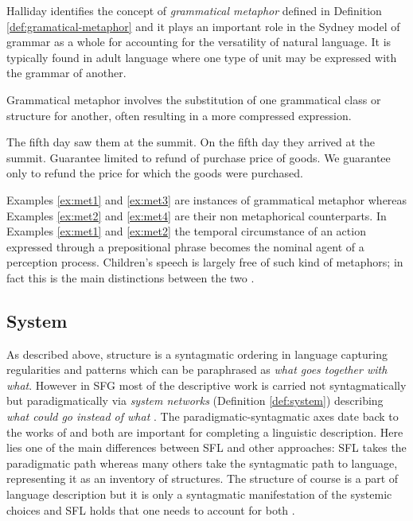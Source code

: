     Halliday identifies the concept of \textit{grammatical metaphor} defined in Definition \ref{def:gramatical-metaphor} and it plays an important role in the Sydney model of grammar as a whole for accounting for the versatility of natural language. It is typically found in adult language where one type of unit may be expressed with the grammar of another.
    
    \begin{definition}\label{def:gramatical-metaphor}
        Grammatical metaphor involves the substitution of one grammatical class or structure for another, often resulting in a more compressed expression.
    \end{definition}
    
    \begin{exe}
        \ex\label{ex:met1} The fifth day saw them at the summit.
        \ex\label{ex:met2} On the fifth day they arrived at the summit.
        \ex\label{ex:met3} Guarantee limited to refund of purchase price of goods.
        \ex\label{ex:met4} We guarantee only to refund the price for which the goods were purchased.
    \end{exe}
    
    Examples \ref{ex:met1} and \ref{ex:met3} are instances of grammatical metaphor whereas Examples \ref{ex:met2} and \ref{ex:met4} are their non metaphorical counterparts. In Examples \ref{ex:met1} and \ref{ex:met2} the temporal circumstance of an action expressed through a prepositional phrase becomes the nominal agent of a perception process. Children's speech is largely free of such kind of metaphors; in fact this is the main distinctions between the two \citep{Halliday2013}. 

\subsection{System}
\label{sec:system}
    As described above, structure is a syntagmatic ordering in language capturing regularities and patterns which can be paraphrased as \textit{what goes together with what}. However in SFG most of the descriptive work is carried not syntagmatically but paradigmatically via \textit{system networks} (Definition \ref{def:system}) describing \textit{what could go instead of what} \citep[22]{Halliday2013}. The paradigmatic-syntagmatic axes date back to the works of \citet{Saussure15} and both are important for completing a linguistic description. Here lies one of the main differences between SFL and other approaches: SFL takes the paradigmatic path whereas many others take the syntagmatic path to language, representing it as an inventory of structures.
    The structure of course is a part of language description but it is only a syntagmatic manifestation of the systemic choices and SFL holds that one needs to account for both \citep[23]{Halliday2013}.
    
